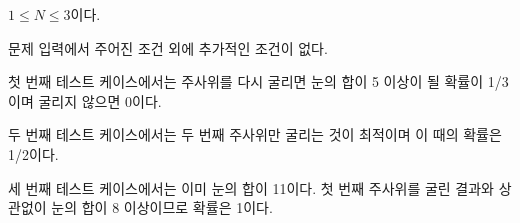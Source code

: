 \begin{problem}{\kcpcdicetitle}
    \SubtaskWithScore{\kcpcdicesmallscore}
    $ 1 \leq N \leq 3 $이다.
    
    \SubtaskWithScore{\kcpcdicelargescore}
    문제 입력에서 주어진 조건 외에 추가적인 조건이 없다.

    \Examples
    
    \begin{example}
    \end{example}
    
    \Explanation
    첫 번째 테스트 케이스에서는 주사위를 다시 굴리면 눈의 합이 5 이상이 될 확률이 1/3이며 굴리지 않으면 0이다.
    
    두 번째 테스트 케이스에서는 두 번째 주사위만 굴리는 것이 최적이며 이 때의 확률은 1/2이다.
    
    세 번째 테스트 케이스에서는 이미 눈의 합이 11이다. 첫 번째 주사위를 굴린 결과와 상관없이 눈의 합이 8 이상이므로 확률은 1이다.
    
    
    
\end{problem}

